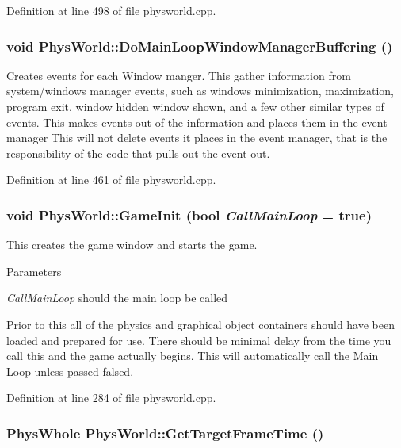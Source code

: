 Definition at line 498 of file physworld.cpp.\hypertarget{classPhysWorld_ae81bab7f314d98f7b787c508e60c9c9a}{
\subsubsection[{DoMainLoopWindowManagerBuffering}]{\setlength{\rightskip}{0pt plus 5cm}void PhysWorld::DoMainLoopWindowManagerBuffering ()}}
\label{db/df5/classPhysWorld_ae81bab7f314d98f7b787c508e60c9c9a}


Creates events for each Window manger. This gather information from system/windows manager events, such as windows minimization, maximization, program exit, window hidden window shown, and a few other similar types of events. This makes events out of the information and places them in the event manager This will not delete events it places in the event manager, that is the responsibility of the code that pulls out the event out. 

Definition at line 461 of file physworld.cpp.\hypertarget{classPhysWorld_afc5116f97cc1e91e899d1a1ca7e14e9b}{
\subsubsection[{GameInit}]{\setlength{\rightskip}{0pt plus 5cm}void PhysWorld::GameInit (bool {\em CallMainLoop} = {\ttfamily true})}}
\label{db/df5/classPhysWorld_afc5116f97cc1e91e899d1a1ca7e14e9b}


This creates the game window and starts the game. 
\begin{DoxyParams}{Parameters}
\item[{\em CallMainLoop}]should the main loop be called\end{DoxyParams}
Prior to this all of the physics and graphical object containers should have been loaded and prepared for use. There should be minimal delay from the time you call this and the game actually begins. This will automatically call the Main Loop unless passed falsed. 

Definition at line 284 of file physworld.cpp.\hypertarget{classPhysWorld_a33e8430ed43897276ca55fbb47e54bcf}{
\subsubsection[{GetTargetFrameTime}]{\setlength{\rightskip}{0pt plus 5cm}PhysWhole PhysWorld::GetTargetFrameTime ()}}
\label{db/df5/classPhysWorld_a33e8430ed43897276ca55fbb47e54bcf}


